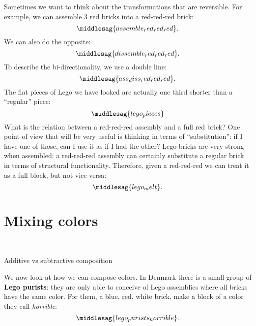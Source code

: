 Sometimes we want to think about the transformations that are reversible.
For example, we can assemble 3 red bricks into a red-red-red brick:
%
\begin{equation}
    \middlesag{assemble_red_red_red}.
\end{equation}
%
We can also do the opposite:
%
\begin{equation}
    \middlesag{dissemble_red_red_red}.
\end{equation}
%
To describe the bi-directionality, we use a double line:
%
\begin{equation}
    \middlesag{ass_diss_red_red_red}.
\end{equation}
%
The flat pieces of Lego we have looked are actually one third shorter than a ``regular'' piece:
%
\begin{equation}
    \middlesag{lego_pieces}
\end{equation}
%
What is the relation between a red-red-red assembly and a full red brick?
One point of view that will be very useful is thinking in terms of ``substitution'': if I have one of those, can I use it as if I had the other?
Lego bricks are very strong when assembled: a red-red-red assembly can certainly substitute a regular brick in terms of structural functionality.
Therefore, given a red-red-red we can treat it as a full block, but not vice versa:
%
\begin{equation}
    \middlesag{lego_melt}.
\end{equation}

\section{Mixing colors}

\begin{marginfigure}
    \centering
    \\
    \caption{Additive vs subtractive composition}
\end{marginfigure}

We now look at how we can compose colors.
In Denmark there is a small group of \textbf{Lego purists}: they are only able to conceive of Lego assemblies where all bricks have the same color.
For them, a blue, red, white brick, make a block of a color they call \emph{horrible}:
%
\begin{equation}
    \middlesag{lego_purists_horrible}.
\end{equation}

